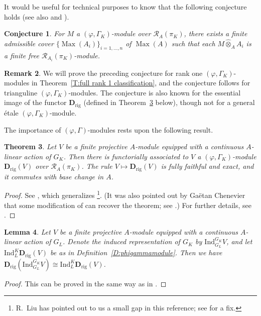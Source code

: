 \documentclass[12pt]{article}
\newtheorem{theorem}{Theorem}[subsection]
\newtheorem{lemma}[theorem]{Lemma}
\newtheorem{conj}[theorem]{Conjecture}
\theoremstyle{definition}
\newtheorem{remark}[theorem]{Remark}
\numberwithin{equation}{theorem}
\newcommand{\calR}{\mathcal{R}}
\newcommand{\bbD}{\mathbf{D}}
\newcommand{\Ind}{\mathrm{Ind}}
\newcommand{\rig}{\mathrm{rig}}
\DeclareMathOperator{\Max}{Max}
\begin{document}
It would be useful for technical purposes to know that the following
conjecture holds (see also \cite[\S3,~Question~1]{R:Bellaiche} and
\cite[Remark~6.2]{kiran-liu}).

\begin{conj}
\label{C:strong locally free}
For $M$ a $(\varphi, \Gamma_K)$-module over $\calR_A(\pi_K)$, there exists a finite admissible cover $\{\Max(A_i)\}_{i=1, \dots, n}$ of $\Max(A)$ such that each $M \widehat\otimes_A A_i$ is a finite \emph{free} $\calR_{A_i}(\pi_K)$-module.
\end{conj}

\begin{remark}
We will prove the preceding conjecture for rank one
$(\varphi,\Gamma_K)$-modules in Theorem~\ref{T:full rank 1
  classification}, and the conjecture follows for trianguline
$(\varphi,\Gamma_K)$-modules.  The conjecture is also known for the
essential image of the functor $\bbD_\rig$ (defined in
Theorem~\ref{T:Drig} below), though not for a general \'etale
$(\varphi,\Gamma_K)$-module.
\end{remark}

The importance of $(\varphi, \Gamma)$-modules rests upon the following result.

\begin{theorem}
\label{T:Drig}
Let $V$ be a finite projective $A$-module equipped with a continuous $A$-linear action of $G_K$.
Then there is functorially associated to $V$ a $(\varphi,\Gamma_K)$-module
$\bbD_\rig(V)$ over $\calR_A(\pi_K)$.  The rule $V \mapsto \bbD_\rig(V)$ is fully faithful and exact, and it commutes with base change in $A$.
\end{theorem}

\begin{proof}
See \cite[Theorem~3.11]{kiran-liu}, which generalizes
\cite[Th\'eor\`eme~4.2.9]{berger-colmez}\footnote{R.~Liu has pointed out to us a small gap in this reference; see \cite[Theorem~1.1.4]{R:Liu2} for a fix.}. (It was also pointed out by Ga\"etan Chenevier that some modification of \cite[Th\'eor\`eme~4.2.9]{berger-colmez} can recover the theorem; see \cite[Remark~3.13]{kiran-liu}.)  For further details, see
\cite[\S2.1]{pottharst1}.
\end{proof}

\begin{lemma}
\label{L:compatibility of induction}
Let $V$ be a finite projective $A$-module equipped with a continuous
$A$-linear action of $G_L$.  Denote the induced representation of
$G_K$ by $\Ind_{G_L}^{G_K} V$, and let $\Ind_L^K \bbD_\rig(V)$ be as
in Definition~\ref{D:phigammamodule}.  Then we have
$\bbD_\rig(\Ind_{G_L}^{G_K} V) \cong \Ind_L^K \bbD_\rig(V)$.
\end{lemma}
\begin{proof}
This can be proved in the same way as in \cite[Proposition~3.1]{liu}.
\end{proof}
\end{document}

